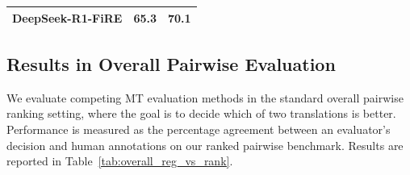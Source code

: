 \documentclass{article}
\theoremstyle{plain}
\theoremstyle{definition}
\theoremstyle{remark}
\newcommand{\enzh}{\textsc{en→zh} }
\newcommand{\ruzh}{\textsc{ru→zh} }
\newcommand{\ruzhx}{\textsc{ru→zh}}
\newcommand{\oursx}{FiRE}
\newcommand{\ours}{FiRE }
\begin{document}
\begin{table}[t]
{\begin{tabular}{lcc}
    DeepSeek-R1-\ours & \textbf{65.3} & \textbf{70.1}\\
    \bottomrule
    \end{tabular}
    }
\end{table}



\subsection{Results in Overall Pairwise Evaluation}\label{sec:overall_pairwise}





We evaluate competing MT evaluation methods in the standard overall pairwise ranking setting, where the goal is to decide which of two translations is better. Performance is measured as the percentage agreement between an evaluator's decision and human annotations on our ranked pairwise benchmark. Results are reported in Table~\ref{tab:overall_reg_vs_rank}.
\end{document}
